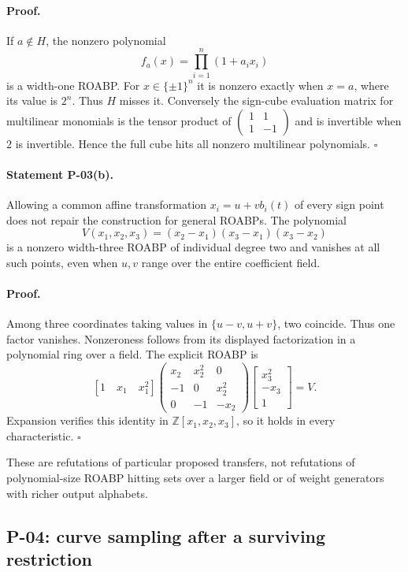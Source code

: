 \documentclass[11pt,a4paper]{article}
\theoremstyle{definition}\newtheorem{definition}{Definition}
\begin{document}
\paragraph{Proof.}
If $a\notin H$, the nonzero polynomial
\[
 f_a(x)=\prod_{i=1}^n(1+a_ix_i)
\]
is a width-one ROABP. For $x\in\{\pm1\}^n$ it is nonzero exactly when $x=a$, where its value is $2^n$. Thus $H$ misses it. Conversely the sign-cube evaluation matrix for multilinear monomials is the tensor product of $\begin{pmatrix}1&1\\1&-1\end{pmatrix}$ and is invertible when $2$ is invertible. Hence the full cube hits all nonzero multilinear polynomials. $\square$

\paragraph{Statement P-03(b).}
Allowing a common affine transformation $x_i=u+vb_i(t)$ of every sign point does not repair the construction for general ROABPs. The polynomial
\[
 V(x_1,x_2,x_3)=(x_2-x_1)(x_3-x_1)(x_3-x_2)
\]
is a nonzero width-three ROABP of individual degree two and vanishes at all such points, even when $u,v$ range over the entire coefficient field.
\paragraph{Proof.}
Among three coordinates taking values in $\{u-v,u+v\}$, two coincide. Thus one factor vanishes. Nonzeroness follows from its displayed factorization in a polynomial ring over a field. The explicit ROABP is
\[
 [1\quad x_1\quad x_1^2]
 \begin{pmatrix}
 x_2&x_2^2&0\\-1&0&x_2^2\\0&-1&-x_2
 \end{pmatrix}
 \begin{bmatrix}x_3^2\\-x_3\\1\end{bmatrix}=V.
\]
Expansion verifies this identity in $\mathbb Z[x_1,x_2,x_3]$, so it holds in every characteristic. $\square$

These are refutations of particular proposed transfers, not refutations of polynomial-size ROABP hitting sets over a larger field or of weight generators with richer output alphabets.

\subsection{P-04: curve sampling after a surviving restriction}
\end{document}
